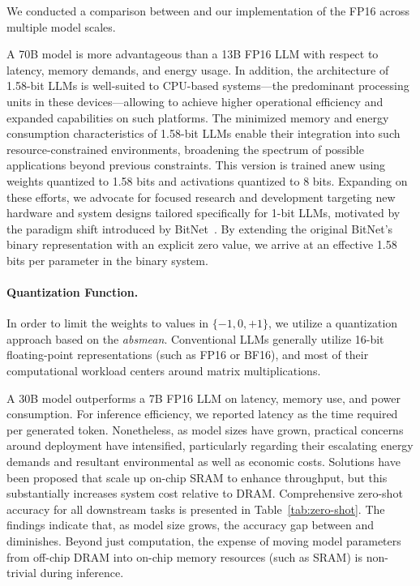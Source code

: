 We conducted a comparison between  and our implementation of the FP16  across multiple model scales. \item A 70B  model is more advantageous than a 13B FP16 LLM with respect to latency, memory demands, and energy usage. In addition, the architecture of 1.58-bit LLMs is well-suited to CPU-based systems—the predominant processing units in these devices—allowing  to achieve higher operational efficiency and expanded capabilities on such platforms. The minimized memory and energy consumption characteristics of 1.58-bit LLMs enable their integration into such resource-constrained environments, broadening the spectrum of possible applications beyond previous constraints. This version is trained anew using weights quantized to 1.58 bits and activations quantized to 8 bits. Expanding on these efforts, we advocate for focused research and development targeting new hardware and system designs tailored specifically for 1-bit LLMs, motivated by the paradigm shift introduced by BitNet~\cite{bitnet}. By extending the original BitNet’s binary representation with an explicit zero value, we arrive at an effective 1.58 bits per parameter in the binary system. \paragraph{Quantization Function.} In order to limit the weights to values in $\{-1, 0, +1\}$, we utilize a quantization approach based on the \emph{absmean}. Conventional LLMs generally utilize 16-bit floating-point representations (such as FP16 or BF16), and most of their computational workload centers around matrix multiplications. \item A 30B  model outperforms a 7B FP16 LLM on latency, memory use, and power consumption. For inference efficiency, we reported latency as the time required per generated token. Nonetheless, as model sizes have grown, practical concerns around deployment have intensified, particularly regarding their escalating energy demands and resultant environmental as well as economic costs. Solutions have been proposed that scale up on-chip SRAM to enhance throughput, but this substantially increases system cost relative to DRAM. Comprehensive zero-shot accuracy for all downstream tasks is presented in Table~\ref{tab:zero-shot}. The findings indicate that, as model size grows, the accuracy gap between  and  diminishes. Beyond just computation, the expense of moving model parameters from off-chip DRAM into on-chip memory resources (such as SRAM) is non-trivial during inference.